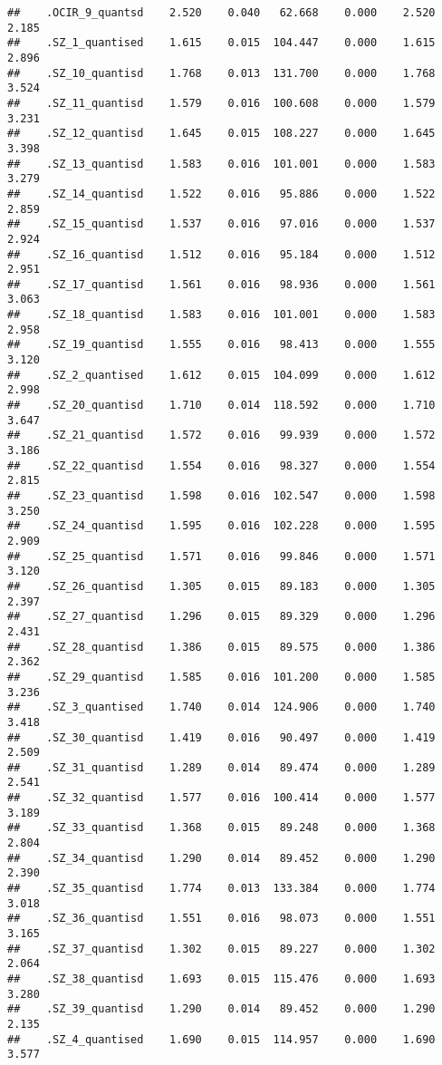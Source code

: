 \documentclass[]{article}
\begin{document}
\begin{verbatim}
##    .OCIR_9_quantsd    2.520    0.040   62.668    0.000    2.520    2.185
##    .SZ_1_quantised    1.615    0.015  104.447    0.000    1.615    2.896
##    .SZ_10_quantisd    1.768    0.013  131.700    0.000    1.768    3.524
##    .SZ_11_quantisd    1.579    0.016  100.608    0.000    1.579    3.231
##    .SZ_12_quantisd    1.645    0.015  108.227    0.000    1.645    3.398
##    .SZ_13_quantisd    1.583    0.016  101.001    0.000    1.583    3.279
##    .SZ_14_quantisd    1.522    0.016   95.886    0.000    1.522    2.859
##    .SZ_15_quantisd    1.537    0.016   97.016    0.000    1.537    2.924
##    .SZ_16_quantisd    1.512    0.016   95.184    0.000    1.512    2.951
##    .SZ_17_quantisd    1.561    0.016   98.936    0.000    1.561    3.063
##    .SZ_18_quantisd    1.583    0.016  101.001    0.000    1.583    2.958
##    .SZ_19_quantisd    1.555    0.016   98.413    0.000    1.555    3.120
##    .SZ_2_quantised    1.612    0.015  104.099    0.000    1.612    2.998
##    .SZ_20_quantisd    1.710    0.014  118.592    0.000    1.710    3.647
##    .SZ_21_quantisd    1.572    0.016   99.939    0.000    1.572    3.186
##    .SZ_22_quantisd    1.554    0.016   98.327    0.000    1.554    2.815
##    .SZ_23_quantisd    1.598    0.016  102.547    0.000    1.598    3.250
##    .SZ_24_quantisd    1.595    0.016  102.228    0.000    1.595    2.909
##    .SZ_25_quantisd    1.571    0.016   99.846    0.000    1.571    3.120
##    .SZ_26_quantisd    1.305    0.015   89.183    0.000    1.305    2.397
##    .SZ_27_quantisd    1.296    0.015   89.329    0.000    1.296    2.431
##    .SZ_28_quantisd    1.386    0.015   89.575    0.000    1.386    2.362
##    .SZ_29_quantisd    1.585    0.016  101.200    0.000    1.585    3.236
##    .SZ_3_quantised    1.740    0.014  124.906    0.000    1.740    3.418
##    .SZ_30_quantisd    1.419    0.016   90.497    0.000    1.419    2.509
##    .SZ_31_quantisd    1.289    0.014   89.474    0.000    1.289    2.541
##    .SZ_32_quantisd    1.577    0.016  100.414    0.000    1.577    3.189
##    .SZ_33_quantisd    1.368    0.015   89.248    0.000    1.368    2.804
##    .SZ_34_quantisd    1.290    0.014   89.452    0.000    1.290    2.390
##    .SZ_35_quantisd    1.774    0.013  133.384    0.000    1.774    3.018
##    .SZ_36_quantisd    1.551    0.016   98.073    0.000    1.551    3.165
##    .SZ_37_quantisd    1.302    0.015   89.227    0.000    1.302    2.064
##    .SZ_38_quantisd    1.693    0.015  115.476    0.000    1.693    3.280
##    .SZ_39_quantisd    1.290    0.014   89.452    0.000    1.290    2.135
##    .SZ_4_quantised    1.690    0.015  114.957    0.000    1.690    3.577

\end{verbatim}
\end{document}
